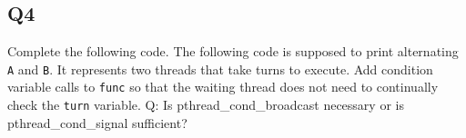 \begin{Shaded}
\begin{Highlighting}[]
  

   
   
\NormalTok{\}}

  
  \NormalTok{); }
  \NormalTok{); }
  \NormalTok{); }
\NormalTok{\}}
\end{Highlighting}
\end{Shaded}

\subsection{Q4}\label{q4}

Complete the following code. The following code is supposed to print
alternating \texttt{A} and \texttt{B}. It represents two threads that
take turns to execute. Add condition variable calls to \texttt{func} so
that the waiting thread does not need to continually check the
\texttt{turn} variable. Q: Is pthread\_cond\_broadcast necessary or is
pthread\_cond\_signal sufficient?

